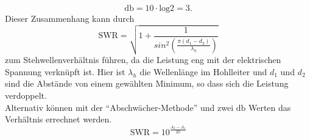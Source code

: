 \begin{equation*}
    \si{\decibel} = 10 \cdot \text{log} 2 = 3.
\end{equation*}
Dieser Zusammenhang kann durch 
\begin{equation}
    \label{eqn:SWR}
    \text{SWR} =\sqrt{1 + \frac{1}{ sin^2 \left( \frac{\pi (d_1 - d_2)}{\lambda_h}  \right)} } 
\end{equation}
zum Stehwellenverhältnis führen, da die Leistung eng mit der elektrischen Spannung verknüpft ist. 
Hier ist $\lambda_h$ die Wellenlänge im Hohlleiter und $d_1$ und $d_2$ sind die Abstände von einem gewählten Minimum, so dass sich die Leistung verdoppelt. \\
Alternativ können mit der \enquote{Abschwächer-Methode} und zwei $\si{\decibel}$ Werten das Verhältnis errechnet werden.
\begin{equation}
    \label{eqn:SWR2}
    \text{SWR} = 10^{\frac{A_2-A_1}{20}}
\end{equation}




